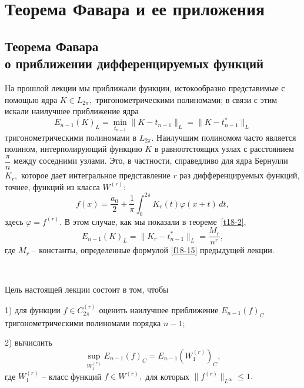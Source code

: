 
 \chapter{Теорема Фавара и ее приложения}

 \section{Теорема Фавара\\ о приближении дифференцируемых
 функций}


 На прошлой лекции мы  приближали функции, истокообразно
 представимые с помощью ядра $K\in L_{2\pi},$
 тригонометрическими полиномами; в связи с этим  искали
 наилучшее приближение ядра
 $$
 E_{n-1}(K)_L=\min_{t_{n-1}}\|K-t_{n-1}\|_L=\|K-t_{n-1}^*\|_L
 $$
 тригонометрическими полиномами в $L_{2\pi}.$ Наилучшим
 полиномом часто является полином, интерполирующий функцию $K$ в
 равноотстоящих узлах с  расстоянием $\dfrac{\pi}{n}$ между соседними узлами.
 Это, в частности, справедливо для ядра Бернулли $K_r,$ которое дает
 интегральное представление $r$ раз дифференцируемых функций, точнее, функций из класса
  $W^{(r)}$:
 $$
 f(x)=\frac{a_0}{2}+\frac{1}{\pi}\int_0^{2\pi} K_r(t)\varphi(x+t)\, dt,
 $$
 здесь $\varphi=f^{(r)}.$ В этом случае, как мы показали в
 теореме~\ref{t18-2},
 $$
  E_{n-1}(K)_L=\| K_r-t_{n-1}^*\|_L=\frac{M_r}{n^r},
 $$
 где $M_r$ --  константы, определенные  формулой \eqref{f18-15} предыдущей лекции.

\ \


Цель настоящей лекции состоит в том, чтобы

 1) для функции $f\in C_{2\pi}^{(r)}$  оценить  наилучшее приближение $E_{n-1}(f)_C$
 тригонометрическими полиномами порядка $n-1;$

 2) вычислить
 $$
 \sup_{{W_1^{(r)}}} E_{n-1}(f)_C=E_{n-1}(W_1^{(r)})_C,
 $$
 где $W_1^{(r)}$ -- класс функций $f\in W^{(r)},$ для которых
 $\|f^{(r)}\|_{L^\infty}\le 1.$

